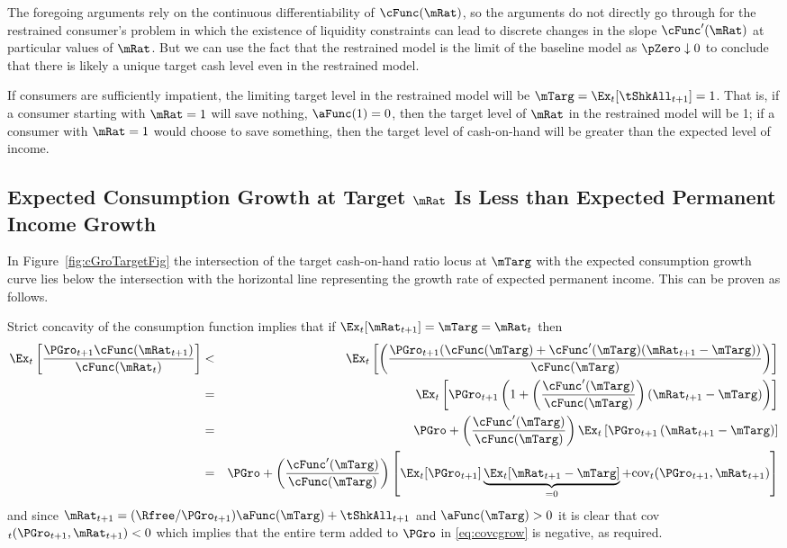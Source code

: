 \documentclass[titlepage]{\econtex}\providecommand{\texname}{BufferStockTheory}%
\begin{document}
{The foregoing arguments rely on the continuous differentiability of
$\cFunc(\mRat)$, so the arguments do not directly go through for the
restrained consumer's problem in which the existence of liquidity
constraints can lead to discrete changes in the slope
$\cFunc^{\prime}(\mRat)$ at particular values of $\mRat$. But we can
use the fact that the restrained model is the limit of the baseline
model as $\pZero \downarrow 0$ to conclude that there is likely a
unique target cash level even in the restrained model.

If consumers are sufficiently impatient, the limiting target level in the
restrained model will be $\mTarg = \Ex_{t}[{\tShkAll}_{t+1}] = 1$. That
is, if a consumer starting with $\mRat = 1$ will save nothing, ${\aFunc}(1)=0$,
then the target level of $\mRat$ in the restrained model will be 1; if a
consumer with $\mRat=1$ would choose to save something, then the target
level of cash-on-hand will be greater than the expected level of income.

\subsection{Expected Consumption Growth at Target $\mRat$ Is Less than
Expected Permanent Income Growth}

\label{subsec:expcgrowth} In Figure~\ref{fig:cGroTargetFig} the intersection of
the target cash-on-hand ratio locus at $\mTarg$ with the expected consumption
growth curve lies below the intersection with the horizontal line
representing the growth rate of expected permanent income. This can be
proven as follows.

Strict concavity of the consumption function implies that if $\Ex_{t}[{\mRat}%
_{t+1}] = \mTarg = \mRat_{t}$ then
\begin{eqnarray}
\Ex_{t}\left[\frac{{\PGro}_{t+1} \cFunc({\mRat}_{t+1})}{\cFunc(\mRat_{t})}
\right] & < & \Ex_{t}\left[\left(\frac{{\PGro}_{t+1}
(\cFunc(\mTarg)+\cFunc^{\prime}(\mTarg)({\mRat}_{t+1}-\mTarg))}{\cFunc(\mTarg)}\right)\right]  \nonumber
\\
%
& = & \Ex_{t}\left[{\PGro}_{t+1} \left(1+\left(\frac{\cFunc^{\prime}(\mTarg)}{%
\cFunc(\mTarg)}\right)({\mRat}_{t+1}-\mTarg)\right)\right]  \nonumber  \\
& = & \PGro + \left(\frac{\cFunc^{\prime}(\mTarg)}{\cFunc(\mTarg)}\right)\Ex_{t}\left[ {\PGro}_{t+1}\left({\mRat}_{t+1}-\mTarg\right)\right]  \nonumber \\
& = & \PGro + \left(\frac{\cFunc^{\prime}(\mTarg)}{\cFunc(\mTarg)}\right)\left[
\Ex_{t}[ \PGro_{t+1}]\underbrace{\Ex_{t}[
{\mRat}_{t+1}-\mTarg]}_{=0}+\mbox{cov}_{t}( {\PGro}_{t+1},{\mRat}_{t+1})\right]
%
 \label{eq:covcgrow}
\end{eqnarray}
and since $\mRat_{t+1} = (\Rfree/\PGro_{t+1}) \aFunc(\mTarg)+\tShkAll_{t+1}$ and
$\aFunc(\mTarg)>0$ it is clear that
cov$_{t}({\PGro}_{t+1},{\mRat}_{t+1})<0$ which implies that
the entire term added to $\PGro$ in \eqref{eq:covcgrow} is negative, as
required.

}
\end{document}
